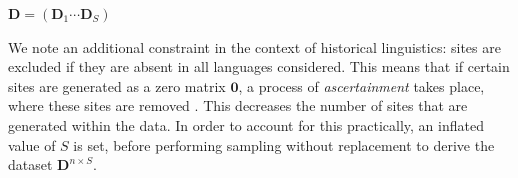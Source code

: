 \begin{algorithm}
\SetAlgoLined
{}
\LinesNumbered
{}

\BlankLine
{}
\BlankLine

\BlankLine
{}
\BlankLine
{}
\Return $\mathbf{D} = (\mathbf{D}_1 \cdots \mathbf{D}_S)$


\caption{Data Generation from binary CTMC model.}
\label{algo:ctmcdatageneration}
\end{algorithm}

We note an additional constraint in the context of historical linguistics: sites are excluded if they are absent in all languages considered. This means that if certain sites are generated as a zero matrix $\mathbf{0}$, a process of \textit{ascertainment} takes place, where these sites are removed \cite{hoffmann_bayesian_2021}. This decreases the number of sites that are generated within the data. In order to account for this practically, an inflated value of $S$ is set, before performing sampling without replacement to derive the dataset $\mathbf{D}^{n\times S}$.

